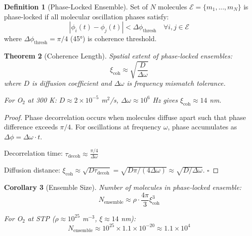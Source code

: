 \documentclass[11pt,a4paper]{article}
\newtheorem{theorem}{Theorem}[section]
\newtheorem{corollary}[theorem]{Corollary}
\theoremstyle{definition}
\newtheorem{definition}[theorem]{Definition}
\theoremstyle{remark}
\begin{document}
\begin{definition}[Phase-Locked Ensemble]
Set of $N$ molecules $\mathcal{E} = \{m_1, ..., m_N\}$ is phase-locked if all molecular oscillation phases satisfy:
\begin{equation}
|\phi_i(t) - \phi_j(t)| < \Delta\phi_{\text{thresh}} \quad \forall i, j \in \mathcal{E}
\end{equation}
where $\Delta\phi_{\text{thresh}} = \pi/4$ (45°) is coherence threshold.
\end{definition}

\begin{theorem}[Coherence Length]
Spatial extent of phase-locked ensembles:
\begin{equation}
\xi_{\text{coh}} \approx \sqrt{\frac{D}{\Delta\omega}}
\end{equation}
where $D$ is diffusion coefficient and $\Delta\omega$ is frequency mismatch tolerance.

For O$_2$ at 300 K: $D \approx 2 \times 10^{-5}$ m$^2$/s, $\Delta\omega \approx 10^6$ Hz gives $\xi_{\text{coh}} \approx 14$ nm.
\end{theorem}

\begin{proof}
Phase decorrelation occurs when molecules diffuse apart such that phase difference exceeds $\pi/4$. For oscillations at frequency $\omega$, phase accumulates as $\Delta\phi = \Delta\omega \cdot t$.

Decorrelation time: $\tau_{\text{decoh}} \approx \frac{\pi/4}{\Delta\omega}$

Diffusion distance: $\xi_{\text{coh}} \approx \sqrt{D \tau_{\text{decoh}}} = \sqrt{D\pi/(4\Delta\omega)} \approx \sqrt{D/\Delta\omega}$. $\square$
\end{proof}

\begin{corollary}[Ensemble Size]
Number of molecules in phase-locked ensemble:
\begin{equation}
N_{\text{ensemble}} \approx \rho \cdot \frac{4\pi}{3}\xi_{\text{coh}}^3
\end{equation}

For O$_2$ at STP ($\rho \approx 10^{25}$ m$^{-3}$, $\xi \approx 14$ nm):
\begin{equation}
N_{\text{ensemble}} \approx 10^{25} \times 1.1 \times 10^{-20} \approx 1.1 \times 10^4
\end{equation}
\end{corollary}
\end{document}
